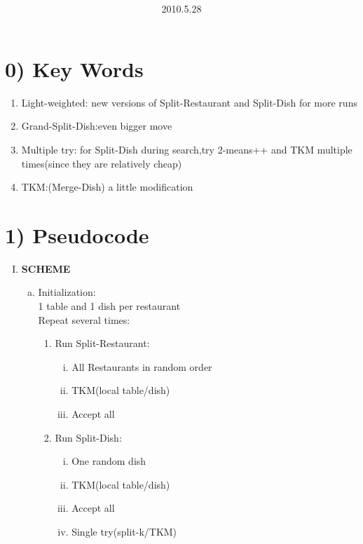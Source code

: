 \documentclass{article}
\title{\vspace{0.3in}\textmd{\textbf{\hmwkTitle}}}
\date{2010.5.28}
\author{\textbf{\hmwkAuthorName}}
\begin{document}
\begin{spacing}{1.1}
\maketitle

\section{0) Key Words}

\begin{enumerate}
\item  Light-weighted: new versions of Split-Restaurant and Split-Dish for more runs
\item  Grand-Split-Dish:even bigger move
\item  Multiple try: for Split-Dish during search,try 2-means++ and TKM multiple times(since they are relatively cheap)
\item  TKM:(Merge-Dish) a little modification
\end{enumerate}


\section{1) Pseudocode}
\begin{enumerate}[(I)]
\item {\bf SCHEME}
\begin{enumerate}[(a)]
 \item Initialization:\\
    1 table and 1 dish per restaurant\\
      Repeat several times:
       \begin{enumerate}[(1)]
        \item Run Split-Restaurant:
\begin{enumerate}[(i)]
\item All Restaurants in random order
\item TKM(local table/dish)
\item Accept all
\end{enumerate}
	\item Run Split-Dish:
\begin{enumerate}[(i)]
\item One random dish
\item TKM(local table/dish)
\item Accept all
\item Single try(split-k/TKM)
\end{enumerate}
      \end{enumerate}
	

\end{enumerate}
\end{enumerate}
\end{spacing}
\end{document}
